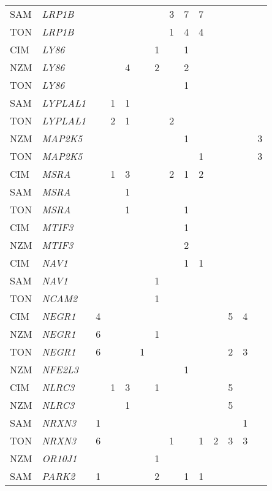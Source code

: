 \documentclass[twoside,openright]{report}
\begin{document}
\begin{ThreePartTable}
\begin{longtable}[t]{llllllllllllll}
SAM & \em{LRP1B} &  &  &  &  &  & 3 & 7 & 7 &  &  &  & \\
TON & \em{LRP1B} &  &  &  &  &  & 1 & 4 & 4 &  &  &  & \\
CIM & \em{LY86} &  &  &  &  & 1 &  & 1 &  &  &  &  & \\
NZM & \em{LY86} &  &  & 4 &  & 2 &  & 2 &  &  &  &  & \\
TON & \em{LY86} &  &  &  &  &  &  & 1 &  &  &  &  & \\
SAM & \em{LYPLAL1} &  & 1 & 1 &  &  &  &  &  &  &  &  & \\
TON & \em{LYPLAL1} &  & 2 & 1 &  &  & 2 &  &  &  &  &  & \\
NZM & \em{MAP2K5} &  &  &  &  &  &  & 1 &  &  &  &  & 3\\
TON & \em{MAP2K5} &  &  &  &  &  &  &  & 1 &  &  &  & 3\\
CIM & \em{MSRA} &  & 1 & 3 &  &  & 2 & 1 & 2 &  &  &  & \\
SAM & \em{MSRA} &  &  & 1 &  &  &  &  &  &  &  &  & \\
TON & \em{MSRA} &  &  & 1 &  &  &  & 1 &  &  &  &  & \\
CIM & \em{MTIF3} &  &  &  &  &  &  & 1 &  &  &  &  & \\
NZM & \em{MTIF3} &  &  &  &  &  &  & 2 &  &  &  &  & \\
CIM & \em{NAV1} &  &  &  &  &  &  & 1 & 1 &  &  &  & \\
SAM & \em{NAV1} &  &  &  &  & 1 &  &  &  &  &  &  & \\
TON & \em{NCAM2} &  &  &  &  & 1 &  &  &  &  &  &  & \\
CIM & \em{NEGR1} & 4 &  &  &  &  &  &  &  &  & 5 & 4 & \\
NZM & \em{NEGR1} & 6 &  &  &  & 1 &  &  &  &  &  &  & \\
TON & \em{NEGR1} & 6 &  &  & 1 &  &  &  &  &  & 2 & 3 & \\
NZM & \em{NFE2L3} &  &  &  &  &  &  & 1 &  &  &  &  & \\
CIM & \em{NLRC3} &  & 1 & 3 &  & 1 &  &  &  &  & 5 &  & \\
NZM & \em{NLRC3} &  &  & 1 &  &  &  &  &  &  & 5 &  & \\
SAM & \em{NRXN3} & 1 &  &  &  &  &  &  &  &  &  & 1 & \\
TON & \em{NRXN3} & 6 &  &  &  &  & 1 &  & 1 & 2 & 3 & 3 & \\
NZM & \em{OR10J1} &  &  &  &  & 1 &  &  &  &  &  &  & \\
SAM & \em{PARK2} & 1 &  &  &  & 2 &  & 1 & 1 &  &  &  & \\

\end{longtable}
\end{ThreePartTable}
\end{document}
